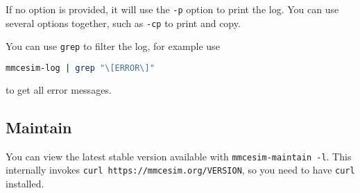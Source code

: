 If no option is provided, it will use the \texttt{-p} option to print the log.
You can use several options together, such as \texttt{-cp} to print and copy.

\begin{tip}
  You can use \texttt{grep} to filter the log, for example use
  \begin{lstlisting}[language=sh]
mmcesim-log | grep "\[ERROR\]"
  \end{lstlisting}
  to get all error messages.
\end{tip}

\subsection{Maintain}
You can view the latest stable version available with
\texttt{mmcesim-maintain~-l}.
This internally invokes \texttt{curl https://mmcesim.org/VERSION},
so you need to have \texttt{curl} installed.
